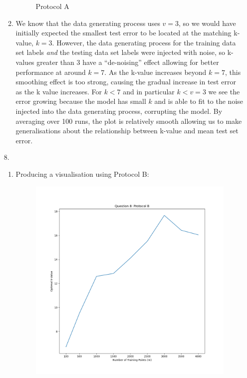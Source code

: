 \documentclass[12pt]{article}
\begin{document}
\begin{enumerate}[leftmargin=\labelsep]
\begin{enumerate}
\begin{figure}[h]
            \caption{Protocol A}
            \label{fig:7}
            \end{figure}
        \item We know that the data generating process uses $v=3$, so we would have initially expected the smallest test error to be located at the matching k-value, $k=3$.
        However, the data generating process for the training data set labels \textit{and} the testing data set labels were injected with noise, so k-values greater than 3 have a ``de-noising'' effect allowing for better performance at around $k=7$.
        As the k-value increases beyond $k=7$, this smoothing effect is too strong, causing the gradual increase in test error as the k value increases.
        For $k<7$ and in particular $k<v=3$ we see the error growing because the model has small $k$ and is able to fit to the noise injected into the data generating process, corrupting the model.
        By averaging over 100 runs, the plot is relatively smooth allowing us to make generalisations about the relationship between k-value and mean test set error.
    \end{enumerate}
\newpage
\item[8.]
    \begin{enumerate}
        \item Producing a visualisation using Protocol B:
            \begin{figure}[h]
            \centering
            \includegraphics[scale=0.5]{outputs/q8/q8}

\end{figure}
\end{enumerate}
\end{enumerate}
\end{document}
